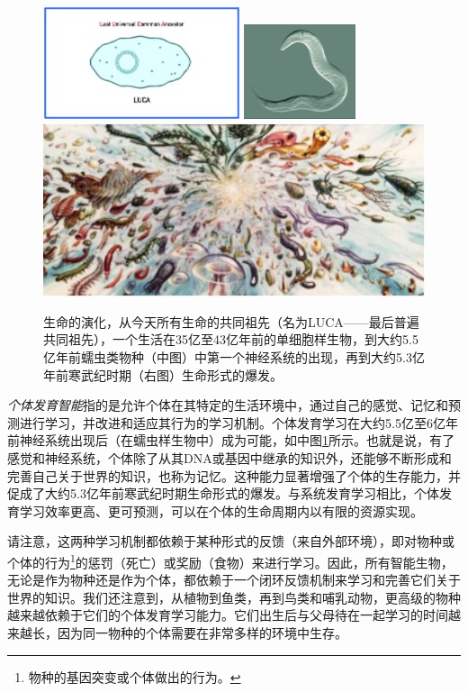 \documentclass[../../book-main.tex]{subfiles}
\begin{document}
\begin{figure}
    \centering
\includegraphics[height=0.19\linewidth]{figs_chap1/Luca.jpg}
\includegraphics[height=0.19\linewidth]{figs_chap1/Worm.jpg}
\includegraphics[height=0.19\linewidth]{figs_chap1/Cambrian.jpg}
    \caption{生命的演化，从今天所有生命的共同祖先（名为LUCA——最后普遍共同祖先），一个生活在35亿至43亿年前的单细胞样生物，到大约5.5亿年前蠕虫类物种（中图）中第一个神经系统的出现，再到大约5.3亿年前寒武纪时期（右图）生命形式的爆发。}
    \label{fig:evolution}
\end{figure}

{\em 个体发育智能}指的是允许个体在其特定的生活环境中，通过自己的感觉、记忆和预测进行学习，并改进和适应其行为的学习机制。个体发育学习在大约5.5亿至6亿年前神经系统出现后（在蠕虫样生物中）成为可能，如中图\ref{fig:evolution}所示。也就是说，有了感觉和神经系统，个体除了从其DNA或基因中继承的知识外，还能够不断形成和完善自己关于世界的知识，也称为记忆。这种能力显著增强了个体的生存能力，并促成了大约5.3亿年前寒武纪时期生命形式的爆发。与系统发育学习相比，个体发育学习效率更高、更可预测，可以在个体的生命周期内以有限的资源实现。

请注意，这两种学习机制都依赖于某种形式的反馈（来自外部环境），即对物种或个体的行为\footnote{物种的基因突变或个体做出的行为。}的惩罚（死亡）或奖励（食物）来进行学习。因此，所有智能生物，无论是作为物种还是作为个体，都依赖于一个闭环反馈机制来学习和完善它们关于世界的知识。我们还注意到，从植物到鱼类，再到鸟类和哺乳动物，更高级的物种越来越依赖于它们的个体发育学习能力。它们出生后与父母待在一起学习的时间越来越长，因为同一物种的个体需要在非常多样的环境中生存。
\end{document}
